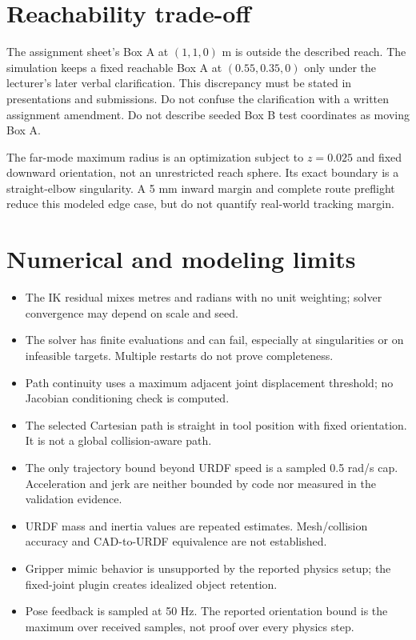 \section{Reachability trade-off}
The assignment sheet's Box A at $(1,1,0)$ m is outside the described reach.
The simulation keeps a fixed reachable Box A at $(0.55,0.35,0)$ only under the
lecturer's later verbal clarification. This discrepancy must be stated in
presentations and submissions. Do not confuse the clarification with a
written assignment amendment. Do not describe seeded Box B test coordinates
as moving Box A.

The far-mode maximum radius is an optimization subject to $z=0.025$ and fixed
downward orientation, not an unrestricted reach sphere. Its exact boundary
is a straight-elbow singularity. A 5 mm inward margin and complete route
preflight reduce this modeled edge case, but do not quantify real-world
tracking margin.

\section{Numerical and modeling limits}
\begin{itemize}
 \item The IK residual mixes metres and radians with no unit weighting; solver
 convergence may depend on scale and seed.
 \item The solver has finite evaluations and can fail, especially at
 singularities or on infeasible targets. Multiple restarts do not prove
 completeness.
 \item Path continuity uses a maximum adjacent joint displacement threshold;
 no Jacobian conditioning check is computed.
 \item The selected Cartesian path is straight in tool position with fixed
 orientation. It is not a global collision-aware path.
 \item The only trajectory bound beyond URDF speed is a sampled 0.5 rad/s
 cap. Acceleration and jerk are neither bounded by code nor measured in the
 validation evidence.
 \item URDF mass and inertia values are repeated estimates. Mesh/collision
 accuracy and CAD-to-URDF equivalence are not established.
 \item Gripper mimic behavior is unsupported by the reported physics setup;
 the fixed-joint plugin creates idealized object retention.
 \item Pose feedback is sampled at 50 Hz. The reported orientation bound is
 the maximum over received samples, not proof over every physics step.
\end{itemize}

